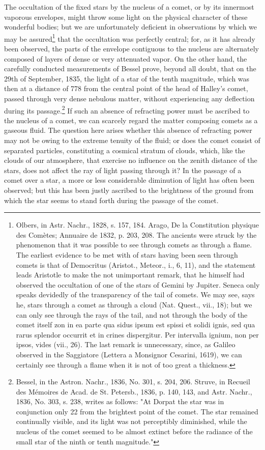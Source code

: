 The occultation of the fixed stars by the nucleus of a comet, or by its innermost vaporous envelopes, might throw some light on the physical character of these wonderful bodies; but we are unfortunately deficient in observations by which we may be assured\footnote{Olbers, in Astr. Nachr., 1828, s. 157, 184. Arago, De la Constitution physique des Comètes; Annuaire de 1832, p. 203, 208. The ancients were struck by the phenomenon that it was possible to see through comets as through a flame. The earliest evidence to be met with of stars having been seen through comets is that of Democritus (Aristot., Meteor., i., 6, 11), and the statement leads Aristotle to make the not unimportant remark, that he himself had observed the occultation of one of the stars of Gemini by Jupiter. Seneca only speaks devidedly of the transparency of the tail of comets. We may see, says he, stars through a comet as through a cloud (Nat. Quest., vii., 18); but we can only see through the rays of the tail, and not through the body of the comet itself zon in ea parte qua sidus ipsum est spissi et solidi ignis, sed qua rarus splendor occurrit et in crines dispergitur. Per intervalla ignium, non per ipsos, vides (vii., 26). The last remark is unnecessary, since, as Galileo observed in the Saggiatore (Lettera a Monsignor Cesarini, 1619), we can certainly see through a flame when it is not of too great a thickness.} that the occultation was perfectly central; for, as it has already been observed, the parts of the envelope contiguous to the nucleus are alternately composed of layers of dense or very attenuated vapor. On the other hand, the carefully conducted measurements of Bessel prove, beyond all doubt, that on the 29th of September, 1835, the light of a star of the tenth magnitude, which was then at a distance of 778 from the central point of the head of Halley's comet, passed through very dense nebulous matter, without experiencing any deflection during its passage.\footnote{Bessel, in the Astron. Nachr., 1836, No. 301, s. 204, 206. Struve, in Recueil des Mémoires de Acad. de St. Petersb., 1836, p. 140, 143, and Astr. Nachr., 1836, No. 303, s. 238, writes as follows: "At Dorpat the star was in conjunction only 22 from the brightest point of the comet. The star remained continually visible, and its light was not perceptibly diminished, while the nucleus of the comet seemed to be almost extinct before the radiance of the small star of the ninth or tenth magnitude."} If such an absence of refracting power must be ascribed to the nucleus of a comet, we can scarcely regard the matter composing comets as a gaseous fluid. The question here arises whether this absence of refracting power may not be owing to the extreme tenuity of the fluid; or does the comet consist of separated particles, constituting a cosmical stratum of clouds, which, like the clouds of our atmosphere, that exercise no influence on the zenith distance of the stars, does not affect the ray of light passing through it? In the passage of a comet over a star, a more or less considerable diminution of light has often been observed; but this has been justly ascribed to the brightness of the ground from which the star seems to stand forth during the passage of the comet.

